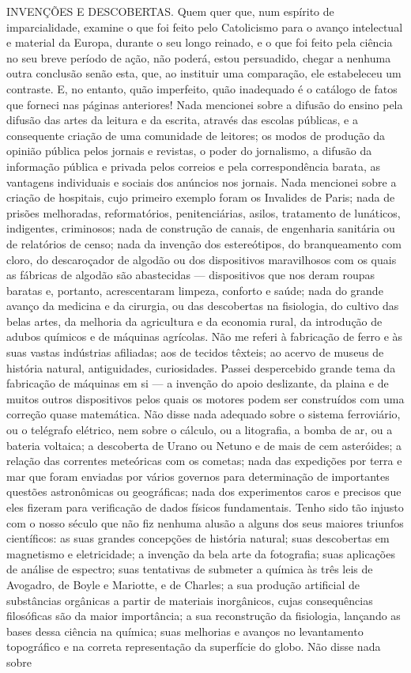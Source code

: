 \documentclass[11pt,a5paper,twoside,openany]{book}
\begin{document}
INVENÇÕES E DESCOBERTAS. Quem quer que, num espírito de imparcialidade, examine o que foi feito pelo Catolicismo para o avanço intelectual e material da Europa, durante o seu longo reinado, e o que foi feito pela ciência no seu breve período de ação, não poderá, estou persuadido, chegar a nenhuma outra conclusão senão esta, que, ao instituir uma comparação, ele estabeleceu um contraste. E, no entanto, quão imperfeito, quão inadequado é o catálogo de fatos que forneci nas páginas anteriores! Nada mencionei sobre a difusão do ensino pela difusão das artes da leitura e da escrita, através das escolas públicas, e a consequente criação de uma comunidade de leitores; os modos de produção da opinião pública pelos jornais e revistas, o poder do jornalismo, a difusão da informação pública e privada pelos correios e pela correspondência barata, as vantagens individuais e sociais dos anúncios nos jornais. Nada mencionei sobre a criação de hospitais, cujo primeiro exemplo foram os Invalides de Paris; nada de prisões melhoradas, reformatórios, penitenciárias, asilos, tratamento de lunáticos, indigentes, criminosos; nada de construção de canais, de engenharia sanitária ou de relatórios de censo; nada da invenção dos estereótipos, do branqueamento com cloro, do descaroçador de algodão ou dos dispositivos maravilhosos com os quais as fábricas de algodão são abastecidas — dispositivos que nos deram roupas baratas e, portanto, acrescentaram limpeza, conforto e saúde; nada do grande avanço da medicina e da cirurgia, ou das descobertas na fisiologia, do cultivo das belas artes, da melhoria da agricultura e da economia rural, da introdução de adubos químicos e de máquinas agrícolas. Não me referi à fabricação de ferro e às suas vastas indústrias afiliadas; aos de tecidos têxteis; ao acervo de museus de história natural, antiguidades, curiosidades. Passei despercebido grande tema da fabricação de máquinas em si — a invenção do apoio deslizante, da plaina e de muitos outros dispositivos pelos quais os motores podem ser construídos com uma correção quase matemática. Não disse nada adequado sobre o sistema ferroviário, ou o telégrafo elétrico, nem sobre o cálculo, ou a litografia, a bomba de ar, ou a bateria voltaica; a descoberta de Urano ou Netuno e de mais de cem asteróides; a relação das correntes meteóricas com os cometas; nada das expedições por terra e mar que foram enviadas por vários governos para determinação de importantes questões astronômicas ou geográficas; nada dos experimentos caros e precisos que eles fizeram para verificação de dados físicos fundamentais. Tenho sido tão injusto com o nosso século que não fiz nenhuma alusão a alguns dos seus maiores triunfos científicos: as suas grandes concepções de história natural; suas descobertas em magnetismo e eletricidade; a invenção da bela arte da fotografia; suas aplicações de análise de espectro; suas tentativas de submeter a química às três leis de Avogadro, de Boyle e Mariotte, e de Charles; a sua produção artificial de substâncias orgânicas a partir de materiais inorgânicos, cujas consequências filosóficas são da maior importância; a sua reconstrução da fisiologia, lançando as bases dessa ciência na química; suas melhorias e avanços no levantamento topográfico e na correta representação da superfície do globo. Não disse nada sobre 
\end{document}
